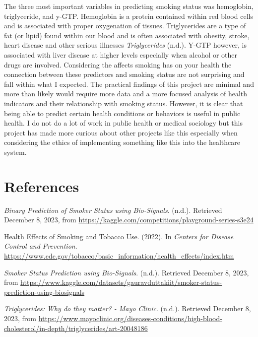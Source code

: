 \documentclass[
  12pt,
  letterpaper,
]{article}
\newlength{\cslhangindent}
\newlength{\cslentryspacingunit} %
\newenvironment{CSLReferences}[2] %
 {%
  \setlength{\parindent}{0pt}
  \ifodd #1
  \let\oldpar\par
  \def\par{\hangindent=\cslhangindent\oldpar}
  \fi
  \setlength{\parskip}{#2\cslentryspacingunit}
 }%
 {}
\begin{document}
The three most important variables in predicting smoking status was
hemoglobin, triglyceride, and y-GTP. Hemoglobin is a protein contained
within red blood cells and is associated with proper oxygenation of
tissues. Triglycerides are a type of fat (or lipid) found within our
blood and is often associated with obesity, stroke, heart disease and
other serious illnesses \emph{Triglycerides} (n.d.). Y-GTP however, is
associated with liver disease at higher levels especially when alcohol
or other drugs are involved. Considering the affects smoking has on your
health the connection between these predictors and smoking status are
not surprising and fall within what I expected. The practical findings
of this project are minimal and more than likely would require more data
and a more focused analysis of health indicators and their relationship
with smoking status. However, it is clear that being able to predict
certain health conditions or behaviors is useful in public health. I do
not do a lot of work in public health or medical sociology but this
project has made more curious about other projects like this especially
when considering the ethics of implementing something like this into the
healthcare system.

\hypertarget{bibliography}{%
\section*{References}\label{bibliography}}

\hypertarget{refs}{}
\begin{CSLReferences}{1}{0}
\leavevmode{}%
\emph{Binary {Prediction} of {Smoker} {Status} using {Bio}-{Signals}}.
(n.d.). Retrieved December 8, 2023, from
\url{https://kaggle.com/competitions/playground-series-s3e24}

\leavevmode{}%
Health {Effects} of {Smoking} and {Tobacco} {Use}. (2022). In
\emph{Centers for Disease Control and Prevention}.
\url{https://www.cdc.gov/tobacco/basic_information/health_effects/index.htm}

\leavevmode{}%
\emph{Smoker {Status} {Prediction} using {Bio}-{Signals}}. (n.d.).
Retrieved December 8, 2023, from
\url{https://www.kaggle.com/datasets/gauravduttakiit/smoker-status-prediction-using-biosignals}

\leavevmode{}%
\emph{Triglycerides: {Why} do they matter? - {Mayo} {Clinic}}. (n.d.).
Retrieved December 8, 2023, from
\url{https://www.mayoclinic.org/diseases-conditions/high-blood-cholesterol/in-depth/triglycerides/art-20048186}

\end{CSLReferences}
\end{document}
